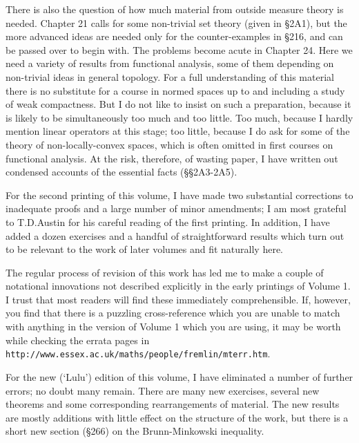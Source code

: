 There is also the question of how much material from outside measure 
theory is needed.   Chapter 21 calls for some non-trivial set theory 
(given in \S2A1), but the more advanced ideas are needed only for the 
counter-examples in \S216, and can be passed over to begin with.   The 
problems become acute in Chapter 24.   Here we need a variety of results 
from functional analysis, some of them depending on non-trivial ideas in 
general topology.   For a full understanding of this material there is 
no substitute for a course in normed spaces up to and including a study 
of weak compactness.   But I do not like to insist on such a 
preparation, because it is likely to be simultaneously too much and too 
little.   Too much, because I hardly mention linear operators at this 
stage;  too little, because I do ask for some of the theory of 
non-locally-convex spaces, which is often omitted in first courses on 
functional analysis.   At the risk, therefore, of wasting paper, I have 
written out condensed accounts of the essential facts  
(\S\S2A3-2A5).  %
 
\bigskip
     
     
\medskip
     
For the second printing of this volume, I have made two substantial
corrections to inadequate proofs and a large number of minor amendments;
I am most grateful to T.D.Austin for his careful reading of the first
printing.   In addition, I have added a dozen exercises and a handful of
straightforward results which turn out to be relevant to the work of
later volumes and fit naturally here.
     
The regular process of revision of this work has led me to make a couple
of notational innovations not described explicitly in the early printings
of Volume 1.   I trust that most readers will find these immediately
comprehensible.   If, however, you find that there is a puzzling
cross-reference which you are unable to match with anything in the
version of Volume 1 which you are using, it may be worth while checking
the errata pages in {\tt
http://www.essex.ac.uk/maths/people/fremlin/mterr.htm}.
     
\bigskip


\medskip

For the new (`Lulu') edition of this volume, I have eliminated a number of
further errors;  no doubt many remain.   There are many new exercises,
several new theorems
and some corresponding rearrangements of material.
The new results are mostly additions with little effect on the structure of
the work, but there is a short new section (\S266) on the Brunn-Minkowski
inequality.


